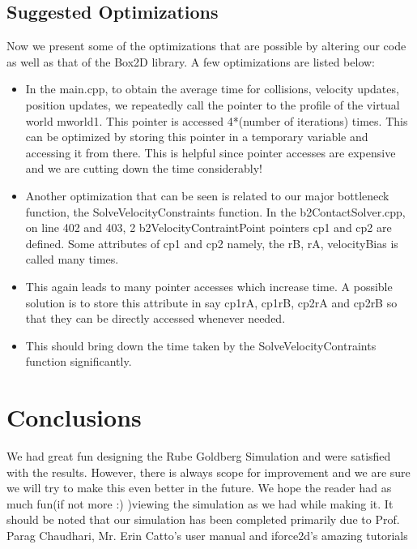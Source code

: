 \documentclass[11pt]{article}
\begin{document}
	\subsection{Suggested Optimizations}
		Now we present some of the optimizations that are possible by altering our code as well as that of the Box2D library. A few optimizations are listed below:
		\begin{itemize}
			\item In the main.cpp, to obtain the average time for collisions, velocity updates, position updates, we repeatedly call the pointer to the profile of the virtual world mworld1. This pointer is accessed 4*(number of iterations) times. This can be optimized by storing this pointer in a temporary variable and accessing it from there. This is helpful since pointer accesses are expensive and we are cutting down the time considerably!
			\item Another optimization that can be seen is related to our major bottleneck function, the SolveVelocityConstraints function. In the b2ContactSolver.cpp, on line 402 and 403, 2 b2VelocityContraintPoint pointers cp1 and cp2 are defined. Some attributes of cp1 and cp2 namely, the rB, rA, velocityBias is called many times.
			\item This again leads to many pointer accesses which increase time. A possible solution is to store this attribute in say cp1rA, cp1rB, cp2rA and cp2rB so that they can be directly accessed whenever needed. 
			\item This should bring down the time taken by the SolveVelocityContraints function significantly.
	\end{itemize}


\section{Conclusions}
We had great fun designing the Rube Goldberg Simulation and were satisfied with the results. 
However, there is always scope for improvement and we are sure we will try to make this even better in the future. We hope the reader had as much fun(if not more :) )viewing the simulation as we had while making it. It should be noted that our simulation has been completed primarily due to Prof. Parag Chaudhari, Mr. Erin Catto's user manual\cite{box2dman}
and iforce2d's amazing tutorials\cite{iforce}


\end{document}
